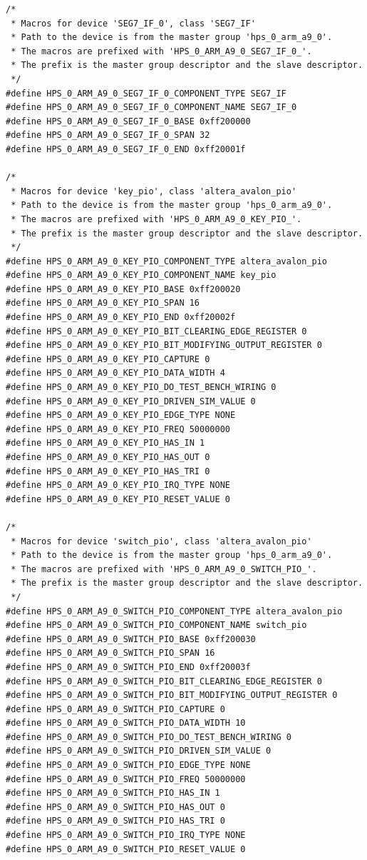 \documentclass[conference]{IEEEtran}
\begin{document}
\begin{lstlisting}
/*
 * Macros for device 'SEG7_IF_0', class 'SEG7_IF'
 * Path to the device is from the master group 'hps_0_arm_a9_0'.
 * The macros are prefixed with 'HPS_0_ARM_A9_0_SEG7_IF_0_'.
 * The prefix is the master group descriptor and the slave descriptor.
 */
#define HPS_0_ARM_A9_0_SEG7_IF_0_COMPONENT_TYPE SEG7_IF
#define HPS_0_ARM_A9_0_SEG7_IF_0_COMPONENT_NAME SEG7_IF_0
#define HPS_0_ARM_A9_0_SEG7_IF_0_BASE 0xff200000
#define HPS_0_ARM_A9_0_SEG7_IF_0_SPAN 32
#define HPS_0_ARM_A9_0_SEG7_IF_0_END 0xff20001f

/*
 * Macros for device 'key_pio', class 'altera_avalon_pio'
 * Path to the device is from the master group 'hps_0_arm_a9_0'.
 * The macros are prefixed with 'HPS_0_ARM_A9_0_KEY_PIO_'.
 * The prefix is the master group descriptor and the slave descriptor.
 */
#define HPS_0_ARM_A9_0_KEY_PIO_COMPONENT_TYPE altera_avalon_pio
#define HPS_0_ARM_A9_0_KEY_PIO_COMPONENT_NAME key_pio
#define HPS_0_ARM_A9_0_KEY_PIO_BASE 0xff200020
#define HPS_0_ARM_A9_0_KEY_PIO_SPAN 16
#define HPS_0_ARM_A9_0_KEY_PIO_END 0xff20002f
#define HPS_0_ARM_A9_0_KEY_PIO_BIT_CLEARING_EDGE_REGISTER 0
#define HPS_0_ARM_A9_0_KEY_PIO_BIT_MODIFYING_OUTPUT_REGISTER 0
#define HPS_0_ARM_A9_0_KEY_PIO_CAPTURE 0
#define HPS_0_ARM_A9_0_KEY_PIO_DATA_WIDTH 4
#define HPS_0_ARM_A9_0_KEY_PIO_DO_TEST_BENCH_WIRING 0
#define HPS_0_ARM_A9_0_KEY_PIO_DRIVEN_SIM_VALUE 0
#define HPS_0_ARM_A9_0_KEY_PIO_EDGE_TYPE NONE
#define HPS_0_ARM_A9_0_KEY_PIO_FREQ 50000000
#define HPS_0_ARM_A9_0_KEY_PIO_HAS_IN 1
#define HPS_0_ARM_A9_0_KEY_PIO_HAS_OUT 0
#define HPS_0_ARM_A9_0_KEY_PIO_HAS_TRI 0
#define HPS_0_ARM_A9_0_KEY_PIO_IRQ_TYPE NONE
#define HPS_0_ARM_A9_0_KEY_PIO_RESET_VALUE 0

/*
 * Macros for device 'switch_pio', class 'altera_avalon_pio'
 * Path to the device is from the master group 'hps_0_arm_a9_0'.
 * The macros are prefixed with 'HPS_0_ARM_A9_0_SWITCH_PIO_'.
 * The prefix is the master group descriptor and the slave descriptor.
 */
#define HPS_0_ARM_A9_0_SWITCH_PIO_COMPONENT_TYPE altera_avalon_pio
#define HPS_0_ARM_A9_0_SWITCH_PIO_COMPONENT_NAME switch_pio
#define HPS_0_ARM_A9_0_SWITCH_PIO_BASE 0xff200030
#define HPS_0_ARM_A9_0_SWITCH_PIO_SPAN 16
#define HPS_0_ARM_A9_0_SWITCH_PIO_END 0xff20003f
#define HPS_0_ARM_A9_0_SWITCH_PIO_BIT_CLEARING_EDGE_REGISTER 0
#define HPS_0_ARM_A9_0_SWITCH_PIO_BIT_MODIFYING_OUTPUT_REGISTER 0
#define HPS_0_ARM_A9_0_SWITCH_PIO_CAPTURE 0
#define HPS_0_ARM_A9_0_SWITCH_PIO_DATA_WIDTH 10
#define HPS_0_ARM_A9_0_SWITCH_PIO_DO_TEST_BENCH_WIRING 0
#define HPS_0_ARM_A9_0_SWITCH_PIO_DRIVEN_SIM_VALUE 0
#define HPS_0_ARM_A9_0_SWITCH_PIO_EDGE_TYPE NONE
#define HPS_0_ARM_A9_0_SWITCH_PIO_FREQ 50000000
#define HPS_0_ARM_A9_0_SWITCH_PIO_HAS_IN 1
#define HPS_0_ARM_A9_0_SWITCH_PIO_HAS_OUT 0
#define HPS_0_ARM_A9_0_SWITCH_PIO_HAS_TRI 0
#define HPS_0_ARM_A9_0_SWITCH_PIO_IRQ_TYPE NONE
#define HPS_0_ARM_A9_0_SWITCH_PIO_RESET_VALUE 0


\end{lstlisting}
\end{document}
